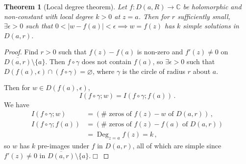 \documentclass{article}
\theoremstyle{plain}\theoremheaderfont{\normalfont\itshape}\theorembodyfont{\rmfamily}\theoremseparator{.}\newtheorem*{rem}{Remark}\newtheorem*{ex}{Example}\newtheorem*{proof}{Proof}\newtheorem*{altp}{Alternative proof}\newtheorem*{con}{Consequences}\newtheorem*{notn}{Notations}\newtheorem*{cau}{Caution}\newtheorem*{term}{Terminology}\newtheorem*{keyex}{Key example}
\theoremstyle{plain}\theoremheaderfont{\normalfont\bfseries}\theorembodyfont{\rmfamily}\theoremseparator{.}\newtheorem{thm}{Theorem}[section]\newtheorem{lem}[thm]{Lemma}\newtheorem{prop}[thm]{Proposition}\newtheorem*{cor}{Corollary}\newtheorem{defn}[thm]{Definition}\newtheorem{clm}[thm]{Claim}\newtheorem{clminproof}{Claim}\newtheorem{leminproof}{Lemma}\newtheorem{app}{Application}
\theoremstyle{break}\theoremheaderfont{\normalfont\itshape}\theorembodyfont{\rmfamily}\theoremseparator{.\medskip}\newtheorem*{proofskip}{Proof}\newtheorem*{exs}{Examples}\newtheorem*{rems}{Remarks}\newtheorem*{rec}{Recall}\newtheorem*{ppts}{Properties}
\theoremstyle{break}\theoremheaderfont{\normalfont\bfseries}\theorembodyfont{\rmfamily}\theoremseparator{.\medskip}\newtheorem{lemskip}[thm]{Lemma}\newtheorem{defnskip}[thm]{Definition}\newtheorem{propskip}[thm]{Proposition}\newtheorem{thmskip}[thm]{Theorem}
\numberwithin{equation}{section}
\DeclareMathOperator*{\Deg}{Deg}
\newcommand{\qed}{\hfill\ensuremath{\Box}}
\newcommand{\abs}[1]{\left|#1\right|}
\newcommand{\CC}{\mathbb{C}}
\begin{document}
    \begin{thm}[Local degree theorem]
        Let \(f:D(a,R)\to\CC\) be holomorphic and non-constant with local degree \(k>0\) at \(z=a\). Then for \(r\) sufficiently small, \(\exists\epsilon>0\) such that \(0<\abs{w-f(a)}<\epsilon\implies w=f(z)\) has \(k\) simple solutions in \(D(a,r)\).
    \end{thm}
    \begin{proof}
        Find \(r>0\) such that \(f(z)-f(a)\) is non-zero and \(f'(z)\ne 0\) on \(\overline{D(a,r)}\setminus\{a\}\). Then \(f\circ\gamma\) does not contain \(f(a)\), so \(\exists\epsilon>0\) such that \(D(f(a),\epsilon)\cap(f\circ\gamma)=\varnothing\), where \(\gamma\) is the circle of radius \(r\) about \(a\).

        \begin{figure}[ht!]
            \centering
        \end{figure}

        Then for \(w\in D(f(a),\epsilon)\),
        \[I(f\circ\gamma;w)=I(f\circ\gamma;f(a))\,.\]
        We have
        \begin{align*}
            I(f\circ\gamma;w)&=(\#\text{ zeros of }f(z)-w\text{ of }D(a,r))\,,\\
            I(f\circ\gamma;f(a))&=(\#\text{ zeros of }f(z)-f(a)\text{ of }D(a,r))\\
            &=\Deg_{z=a}f(z)=k\,,
        \end{align*}
        so \(w\) has \(k\) pre-images under \(f\) in \(D(a,r)\), all of which are simple since \(f'(z)\ne 0\) in \(\overline{D(a,r)}\setminus\{a\}\).\qed
    \end{proof}
\end{document}
